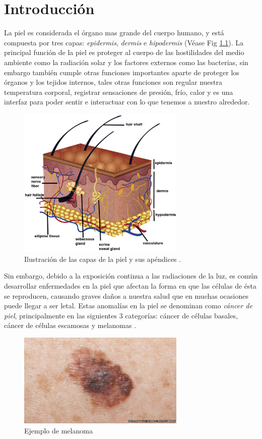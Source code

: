 
\chapter{Introducción}

La piel es considerada el órgano mas grande del cuerpo humano,  y está compuesta por tres capas: \emph{\gls{epidermis}}, \emph{\gls{dermis}} e \emph{\gls{hipodermis}} (Véase Fig \ref{fig:skin1_jpg}). La principal función de la piel es proteger al cuerpo de las hostilidades del medio ambiente como la radiación solar y los factores externos como las bacterias, sin embargo también cumple otras funciones importantes aparte de proteger los órganos y los tejidos internos, tales otras funciones son regular nuestra temperatura corporal, registrar sensaciones de presión, frío, calor y es una interfaz para poder sentir e interactuar con lo que tenemos a nuestro alrededor.


\begin{figure}[h!]
    \includegraphics[width=80mm, scale = 0.5]{Figuras/skin_structure1.jpg}
    \centering
    \caption{Ilustración de las capas de la piel y sus apéndices \citep{skin_1}.}
    \label{fig:skin1_jpg}
\end{figure}

Sin embargo, debido a la exposición continua a las radiaciones de la luz, es común desarrollar enfermedades en la piel que afectan la forma en que las células de ésta se reproducen, causando graves daños a nuestra salud que en muchas ocasiones puede llegar a ser letal. Estas anomalías en la piel se denominan como \emph{cáncer de piel}, principalmente en las siguientes 3 categorías: cáncer de células basales, cáncer de células escamosas y melanomas \citep{cancer_org}.

\begin{figure}[h!]
    \includegraphics[width=80mm, scale = 0.8]{Figuras/skin_cancer_bbc.jpg}
    \centering
    \caption{Ejemplo de melanoma \citep{cancer_img_1}}
    \label{fig:can_jpg}
\end{figure}

